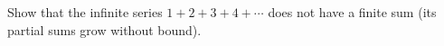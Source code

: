 Show that the infinite series $1+2+3+4+\cdots$ does not have a finite sum (its partial sums grow without bound).
